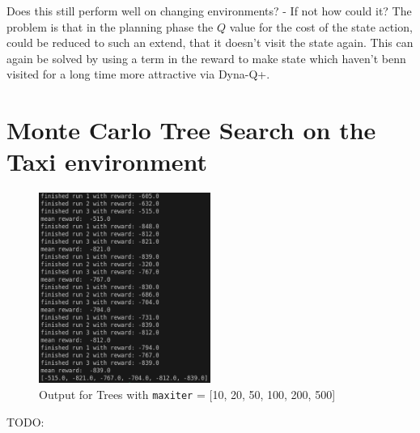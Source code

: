 \documentclass{article}
\begin{document}
Does this still perform well on changing environments? - If not how could it? The problem is that in the planning phase the $Q$ value for the cost of the state action, could be reduced to such an extend, that it doesn't visit the state again. This can again be solved by using a term in the reward to make state which haven't benn visited for a long time more attractive via Dyna-Q+.



\section{Monte Carlo Tree Search on the Taxi environment}

\begin{figure}[H]
\centering
\includegraphics[width=0.5\textwidth]{images/terminal.png}
\caption{Output for Trees with \texttt{maxiter} = [10, 20, 50, 100, 200, 500]}
\label{fig:terminal}
\end{figure}
TODO:
\end{document}
